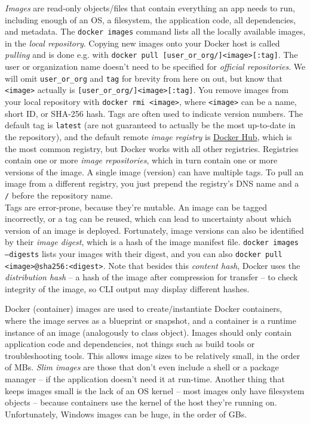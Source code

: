 \documentclass[table, xcdraw]{article}%
\begin{document}
\emph{Images} are read-only objects/files that contain everything an app needs to run, including enough of an OS, a filesystem, the application code, all dependencies, and metadata. The \texttt{docker images} command lists all the locally available images, in the \emph{local repository}. Copying new images onto your Docker host is called \emph{pulling} and is done e.g. with \texttt{docker pull [user_or_org/]<image>[:tag]}. The user or organization name doesn't need to be specified for \emph{official repositories}. We will omit \texttt{user_or_org} and \texttt{tag} for brevity from here on out, but know that \texttt{<image>} actually is \texttt{[user_or_org/]<image>[:tag]}. You remove images from your local repository with \texttt{docker rmi <image>}, where \texttt{<image>} can be a name, short ID, or SHA-256 hash. Tags are often used to indicate version numbers. The default tag is \texttt{latest} (are not guaranteed to actually be the most up-to-date in the repository), and the default remote \emph{image registry} is \href{https://hub.docker.com/}{Docker Hub}, which is the most common registry, but Docker works with all other registries. Registries contain one or more \emph{image repositories}, which in turn contain one or more versions of the image. A single image (version) can have multiple tags. To pull an image from a different registry, you just prepend the registry’s DNS name and a \texttt{/} before the repository name.\\
Tags are error-prone, because they're mutable. An image can be tagged incorrectly, or a tag can be reused, which can lead to uncertainty about which version of an image is deployed. Fortunately, image versions can also be identified by their \emph{image digest}, which is a hash of the image manifest file. \texttt{docker images --digests} lists your images with their digest, and you can also \texttt{docker pull <image>@sha256:<digest>}. Note that besides this \emph{content hash}, Docker uses the \emph{distribution hash} -- a hash of the image after compression for transfer -- to check integrity of the image, so CLI output may display different hashes.

Docker (container) images are used to create/instantiate Docker containers, where the image serves as a blueprint or snapshot, and a container is a runtime instance of an image (analogously to class \textrightarrow object). Images should only contain application code and dependencies, not things such as build tools or troubleshooting tools. This allows image sizes to be relatively small, in the order of MBs. \emph{Slim images} are those that don't even include a shell or a package manager -- if the application doesn’t need it at run-time. Another thing that keeps images small is the lack of an OS kernel -- most images only have filesystem objects -- because containers use the kernel of the host they’re running on. Unfortunately, Windows images can be huge, in the order of GBs.
\end{document}
